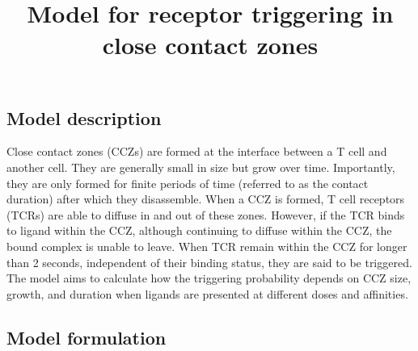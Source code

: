 \documentclass[11pt]{article}
\title{Model for receptor triggering in close contact zones}
\author{}
\date{}
\begin{document}
\maketitle


\begin{abstract}
\end{abstract}



\clearpage

\subsection*{Model description}

Close contact zones (CCZs) are formed at the interface between a T cell and another cell. They are generally small in size but grow over time. Importantly, they are only formed for finite periods of time (referred to as the contact duration) after which they disassemble. When a CCZ is formed, T cell receptors (TCRs) are able to diffuse in and out of these zones. However, if the TCR binds to ligand within the CCZ, although continuing to diffuse within the CCZ, the bound complex is unable to leave. When TCR remain within the CCZ for longer than 2 seconds, independent of their binding status, they are said to be triggered. The model aims to calculate how the triggering probability depends on CCZ size, growth, and duration when ligands are presented at different doses and affinities.

\subsection*{Model formulation}
\end{document}
